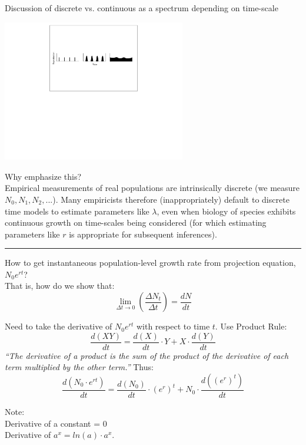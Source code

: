\documentclass{article}
\newcommand{\note}[1]{\colorbox{gray!20}{#1}}
\newcommand*\circled[1]{\tikz[baseline=(char.base)]{
            \node[shape=circle,draw,inner sep=2pt] (char) {#1};}}
\begin{document}
\note{Discussion of discrete vs. continuous as a spectrum depending on time-scale}

\begin{center}
\includegraphics[width=8cm]{figs/image2}
\end{center}

Why emphasize this?\\
Empirical measurements of real populations are intrinsically discrete (we measure $N_0, N_1, N_2, ...$). Many empiricists therefore (inappropriately) default to discrete time models to estimate parameters like $\lambda$, even when biology of  species exhibits continuous growth on  time-scales being considered (for which estimating parameters like $r$ is appropriate for subsequent inferences).

\rule[0.5ex]{\linewidth}{1pt}

\circled{3}
How to get instantaneous population-level growth rate from projection equation, $N_0 e^{rt}$?\\
That is, how do we show that:
\begin{equation*}
\lim_{\Delta t \to 0}\left(\frac{\Delta N_t}{\Delta t}\right) = \frac{dN}{dt}
\end{equation*}

Need to take the derivative of $N_0 e^{rt}$ with respect to time $t$.  Use Product Rule:
\begin{equation*}
\frac{d(XY)}{dt}=\frac{d(X)}{dt}\cdot Y + X \cdot \frac{d(Y)}{dt}
\end{equation*}
\emph{``The derivative of a product is the sum of the product of the derivative of each term multiplied by the other term.''} Thus:
\begin{equation*}
\frac{d(N_0 \cdot e^{rt})}{dt}=\frac{d(N_0)}{dt}\cdot (e^r)^t + N_0 \cdot \frac{d((e^r)^t)}{dt}
\end{equation*}

Note:\\
\-\hspace{1cm} Derivative of a constant = 0\\
\-\hspace{1cm} Derivative of $a^x = ln(a)\cdot a^x$.
\end{document}
